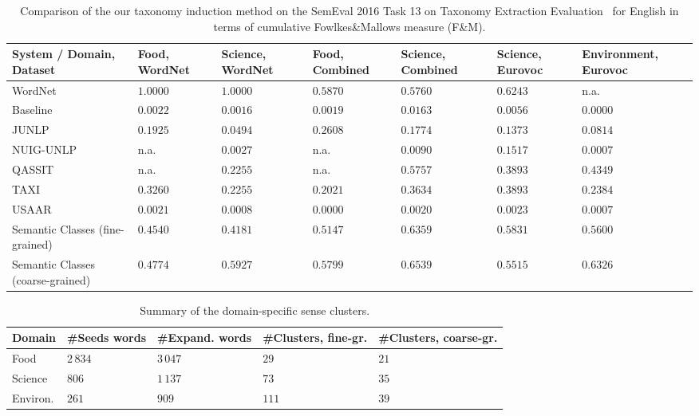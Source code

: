 \documentclass[10pt, a4paper]{article}
\begin{document}
\begin{table}
\footnotesize
\centering
\begin{tabular}{l|p{1.3cm}|p{1.3cm}|p{1.5cm}|p{1.5cm}|p{1.3cm}|p{1.6cm}}
\textbf{System / Domain, Dataset} & \textbf{Food, WordNet} & \textbf{Science, WordNet}& \textbf{Food, Combined} & \textbf{Science, Combined} & \textbf{Science, Eurovoc} & \textbf{Environment, Eurovoc} \\ \toprule

WordNet & $1.0000$ & $1.0000$ & $0.5870$ & $0.5760$ & $0.6243$ & n.a. \\ \midrule

Baseline & $0.0022$ & $0.0016$ & $0.0019$ & $0.0163$ & $0.0056$ & $0.0000$ \\
JUNLP & $0.1925$ & $0.0494$ & $0.2608$ & $0.1774$ & $0.1373$ & $0.0814$ \\
NUIG-UNLP & n.a. & $0.0027$ & n.a. & $0.0090$ & $0.1517$ & $0.0007$ \\
QASSIT & n.a. & $0.2255$ & n.a. & $0.5757$ & $0.3893$ & $0.4349$ \\
TAXI & $0.3260$ & $0.2255$ & $0.2021$ & $0.3634$ & $0.3893$ & $0.2384$ \\
USAAR & $0.0021$ & $0.0008$ & $0.0000$ & $0.0020$ & $0.0023$ & $0.0007$ \\ \midrule

Semantic Classes (fine-grained) & $0.4540$ & $0.4181$ & $0.5147$ & $0.6359$ &  $\mathbf{0.5831}$ & $0.5600$ \\
Semantic Classes (coarse-grained) & $\mathbf{0.4774}$ & $\mathbf{0.5927}$ & $\mathbf{0.5799}$ & $\mathbf{0.6539}$ & $0.5515$ & $\mathbf{0.6326}$ 
\end{tabular}
\caption{Comparison of the our taxonomy induction method on the SemEval 2016 Task 13 on Taxonomy Extraction Evaluation~\cite{bordea2016semeval} for English in terms of cumulative Fowlkes\&Mallows measure (F\&M).}
\label{tab:taxo}
\end{table}



\begin{table}[ht]
\footnotesize
\centering
\begin{tabular}{l|p{0.9cm}|p{1.2cm}|p{1.3cm}|p{1.3cm}}
\textbf{Domain} & \textbf{\#Seeds words} & \textbf{\#Expand. words} & \textbf{\#Clusters}, fine-gr. & \textbf{\#Clusters}, coarse-gr.  \\ \toprule
Food & $2\,834$ & $3\,047$ & $29$ & $21$ \\
Science & $806$ & $1\,137$ & $73$ & $35$ \\
Environ. & $261$ & $909$ & $111$ & $39$ \\
\end{tabular}
\caption{Summary of the domain-specific sense clusters.}
\label{tab:domain-cosets}
\end{table}
\end{document}

